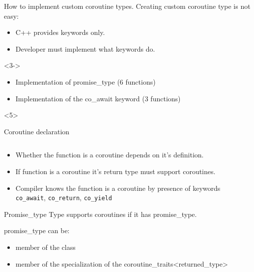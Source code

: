 \documentclass[10pt]{beamer}
\begin{document}
\begin{frame}{How to implement custom coroutine types.}
	Creating custom coroutine type is not easy:
	\begin{itemize}[<+->]
		\item C++ provides keywords \alert{only}.
		\item \alert{Developer must implement} what keywords do.
	\end{itemize}

	\vfill

	<3->
	\begin{itemize}[<+->]
		\item Implementation of promise\_type ({\selectfont\texttildelow}6 functions)
		\item Implementation of the co\_await  keyword ({\selectfont\texttildelow}3 functions)
	\end{itemize}

	\vfill

\end{frame}

\begin{frame}{Coroutine declaration}
  \vfill
  \begin{center}
  \begin{minipage}{0.8\linewidth}
  \inputminted{c++}{code-examples/intro/declaration.hpp}
  \end{minipage}
  \end{center}
  \vfill

  \begin{itemize}[<+->]
  	\item Whether the function is a coroutine depends on \alert{it's definition}.
  	\item If function is a coroutine it's \alert{return type must support coroutines}.
  	\item Compiler knows the function is a coroutine by presence of keywords {\alert{\texttt{co\_await}}, \alert{\texttt{co\_return}}, \alert{\texttt{co\_yield}}}
  \end{itemize}
  
\end{frame}

\begin{frame}{Promise\_type}
	Type supports coroutines \alert{if it has promise\_type}.
	\vfill

	promise\_type can be:
	\begin{itemize}
		\item member of the class
		\item member of the specialization of the coroutine\_traits<returned\_type>
	\end{itemize}
\end{frame}
\end{document}
